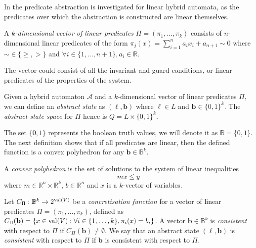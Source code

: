 In \cite{Alur2002} the predicate abstraction is investigated for linear hybrid automata, as the predicates over which the abstraction is constructed are linear themselves.

\begin{defi}
A \emph{$k$-dimensional vector of linear predicates} $\Pi=(\pi_{1},\ldots,\pi_{k})$ consists of $n$-dimensional linear predicates of the form $\pi_{j}(x)=\sum_{i=1}^{n}a_{i}x_{i}+a_{n+1}\sim0$ where $\sim\in\{\geq,>\}$ and $\forall i\in\{1,\ldots,n+1\}, a_{i}\in\mathbb{R}$.
\end{defi}

The vector could consist of all the invariant and guard conditions, or linear predicates of the properties of the system.

\begin{defi}
Given a hybrid automaton $\mathcal{A}$ and a $k$-dimensional vector of linear predicates $\Pi$, we can define an \emph{abstract state} as $(\ell,\mathbf{b})$ where $\ell\in L$ and $\mathbf{b}\in \{0,1\}^{k}$. The \emph{abstract state space} for $\Pi$ hence is $Q=L\times\{0,1\}^{k}$.
\end{defi}

The set $\{0,1\}$ represents the boolean truth values, we will denote it as $\mathbb{B}=\{0,1\}$. The next definition shows that if all predicates are linear, then the defined function is a convex polyhedron for any $\mathbf{b}\in\mathbb{B}^{k}$.

A \emph{convex polyhedron} is the set of solutions to the system of linear inequalities
\[
m x \leq y
\]
where $m\in\mathbb{R}^{n}\times\mathbb{R}^{k}$, $b\in\mathbb{R}^{n}$ and $x$ is a $k$-vector of variables.


\begin{defi}
Let $C_{\Pi} : \mathbb{B}^{k}\rightarrow 2^{\operatorname{val}(V)}$ be a \emph{concretisation function} for a vector of linear predicates $\Pi=(\pi_{1},\ldots,\pi_{k})$, defined as
 $C_{\Pi}(\mathbf{b})=\{x\in\operatorname{val}(V) : \forall i \in \{1,\ldots,k\}, \pi_{i}(x) = b_{i}\}$. A vector $\mathbf{b}\in\mathbb{B}^{k}$ is \emph{consistent} with respect to $\Pi$ if
 $C_{\Pi}(\mathbf{b})\neq\emptyset$. We say that an abstract state $(\ell,\mathbf{b})$ is \emph{consistent} with respect to $\Pi$ if $\mathbf{b}$ is consistent with respect to $\Pi$.
 \end{defi}

